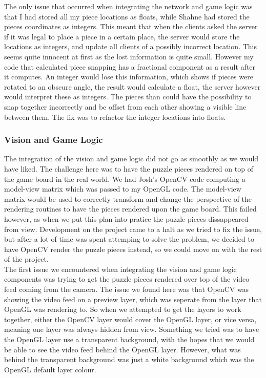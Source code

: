 \documentclass{article}
\begin{document}
The only issue that occurred when integrating the network and game logic was
that I had stored all my piece locations as floats, while Shahne had stored the
pieces coordinates as integers. This meant that when the clients asked the
server if it was legal to place a piece in a certain place, the server would
store the locations as integers, and update all clients of a possibly incorrect
location. This seems quite innocent at first as the lost information is quite
small. However my code that calculated piece snapping has a fractional component
as a result after it computes. An integer would lose this information, which
shows if pieces were rotated to an obscure angle, the result would calculate a
float, the server however would interpret these as integers. The pieces than
could have the possibility to snap together incorrectly and be offset from each
other showing a visible line between them. The fix was to refactor the integer
locations into floats.

\subsubsection{Vision and Game Logic}
The integration of the vision and game logic did not go as smoothly as we would
have liked. The challenge here was to have the puzzle pieces rendered on top of
the game board in the real world. We had Josh's OpenCV code computing a
model-view matrix which was passed to my OpenGL code. The model-view matrix
would be used to correctly transform and change the perspective of the rendering
routines to have the pieces rendered upon the game board. This failed however,
as when we put this plan into pratice the puzzle pieces dissappeared from
view. Development on the project came to a halt as we tried to fix the issue,
but after a lot of time was spent attemping to solve the problem, we decided to
have OpenCV render the puzzle pieces instead, so we could move on with the rest
of the project.\\

\iffalse
The first issue we encountered when integrating the vision and game logic
components was trying to get the puzzle pieces rendered over top of the video feed
coming from the camera. The issue we found here was that OpenCV was showing the
video feed on a preview layer, which was seperate from the layer that OpenGL was
rendering to. So when we attempted to get the layers to work together, either
the OpenCV layer would cover the OpenGL layer, or vice versa, meaning one layer
was always hidden from view. Something we tried was to have the OpenGL layer use
a transparent background, with the hopes that we would be able to see the video
feed behind the OpenGL layer. However, what was behind the transparent
background was just a white background which was the OpenGL default layer
colour.\\
\end{document}
